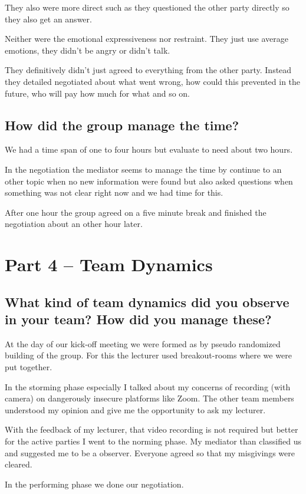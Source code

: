 \documentclass[11pt,fleqn]{book} %
\begin{document}
They also were more direct such as they questioned the other party directly so they also get an answer.

Neither were the emotional expressiveness nor restraint. They just use average emotions, they didn't be angry or didn't talk.

They definitively didn't just agreed to everything from the other party. Instead they detailed negotiated about what went wrong, how could this prevented in the future, who will pay how much for what and so on.

\subsection{How did the group manage the time?}
We had a time span of one to four hours but evaluate to need about two hours.

In the negotiation the mediator seems to manage the time by continue to an other topic when no new information were found but also asked questions when something was not clear right now and we had time for this.

After one hour the group agreed on a five minute break and finished the negotiation about an other hour later.

\section{Part 4 – Team Dynamics}
\subsection{What kind of team dynamics did you observe in your team? How did you manage these?}
At the day of our kick-off meeting we were formed as by pseudo randomized building of the group. For this the lecturer used breakout-rooms where we were put together.

In the storming phase especially I talked about my concerns of recording (with camera) on dangerously insecure platforms like Zoom. The other team members understood my opinion and give me the opportunity to ask my lecturer.

With the feedback of my lecturer, that video recording is not required but better for the active parties I went to the norming phase. My mediator than classified us and suggested me to be a observer. Everyone agreed so that my misgivings were cleared.

In the performing phase we done our negotiation.
\end{document}
